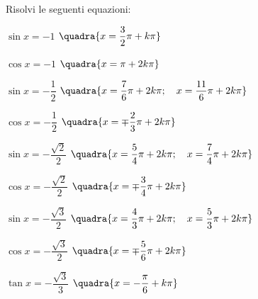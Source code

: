 \begin{esercizio}\label{ese:03.1}
Risolvi le seguenti equazioni:
 \begin{enumeratea}
  \item \(\sin x = -1\)
   \hfill \(\quadra{x = \dfrac{3}{2}\pi + k \pi}\)
  \item \(\cos x = -1\)
   \hfill \(\quadra{x = \pi + 2k \pi}\)
  \item \(\sin x = -\dfrac{1}{2}\)
   \hfill \(\quadra{x = \dfrac{7}{6}\pi + 2k \pi; \quad
                   x = \dfrac{11}{6}\pi + 2k \pi}\)
  \item \(\cos x = -\dfrac{1}{2}\)
   \hfill \(\quadra{x = \mp \dfrac{2}{3}\pi + 2k \pi}\)
  \item \(\sin x = -\dfrac{\sqrt{2}}{2}\)
   \hfill \(\quadra{x = \dfrac{5}{4}\pi + 2k \pi; \quad
                   x = \dfrac{7}{4}\pi + 2k \pi}\)
  \item \(\cos x = -\dfrac{\sqrt{2}}{2}\)
   \hfill \(\quadra{x = \mp \dfrac{3}{4}\pi + 2k \pi}\)
  \item \(\sin x = -\dfrac{\sqrt{3}}{2}\)
   \hfill \(\quadra{x = \dfrac{4}{3}\pi + 2k \pi; \quad
                   x = \dfrac{5}{3}\pi + 2k \pi}\)
  \item \(\cos x = -\dfrac{\sqrt{3}}{2}\)
   \hfill \(\quadra{x = \mp \dfrac{5}{6}\pi + 2k \pi}\)
  \item \(\tan x = -\dfrac{\sqrt{3}}{3}\)
   \hfill \(\quadra{x = -\dfrac{\pi}{6} + k \pi}\)
 \end{enumeratea}
\end{esercizio}

